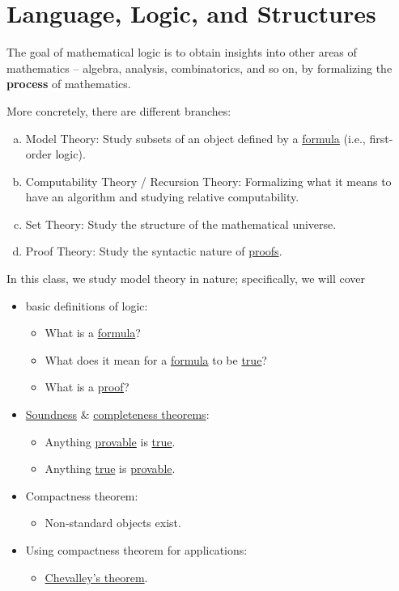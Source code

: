 \chapter{Language, Logic, and Structures}
The goal of mathematical logic is to obtain insights into other areas of mathematics -- algebra, analysis, combinatorics, and so on, by formalizing the \textbf{process} of mathematics.

\begin{remark}
	More concretely, there are different branches:
	\begin{enumerate}[(a)]
		\item Model Theory: Study subsets of an object defined by a \hyperref[def:formula]{formula} (i.e., first-order logic).
		\item Computability Theory / Recursion Theory: Formalizing what it means to have an algorithm and studying relative computability.
		\item Set Theory: Study the structure of the mathematical universe.
		\item Proof Theory: Study the syntactic nature of \hyperref[def:proof]{proofs}.
	\end{enumerate}
\end{remark}

In this class, we study model theory in nature; specifically, we will cover
\begin{itemize}
	\item basic definitions of logic:
	      \begin{itemize}
		      \item What is a \hyperref[def:formula]{formula}?
		      \item What does it mean for a \hyperref[def:formula]{formula} to be \hyperref[def:truth]{true}?
		      \item What is a \hyperref[def:proof]{proof}?
	      \end{itemize}
	\item \hyperref[thm:soundness]{Soundness} \& \hyperref[thm:completeness]{completeness theorems}:
	      \begin{itemize}
		      \item Anything \hyperref[def:proof]{provable} is \hyperref[def:truth]{true}.
		      \item Anything \hyperref[def:truth]{true} is \hyperref[def:proof]{provable}.
	      \end{itemize}
	\item Compactness theorem:
	      \begin{itemize}
		      \item Non-standard objects exist.
	      \end{itemize}
	\item Using compactness theorem for applications:
	      \begin{itemize}
		      \item \href{https://en.wikipedia.org/wiki/Chevalley's_structure_theorem}{Chevalley's theorem}.
	      \end{itemize}
\end{itemize}


